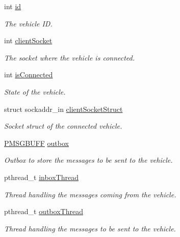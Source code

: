 \begin{DoxyCompactItemize}
\item 
int \hyperlink{struct_s_a___v_e_h_i_c_l_e___d_a_t_a_a7441ef0865bcb3db9b8064dd7375c1ea}{id}
\begin{DoxyCompactList}\small\item\em The vehicle ID. \end{DoxyCompactList}\item 
int \hyperlink{struct_s_a___v_e_h_i_c_l_e___d_a_t_a_adc5475d507e3d713ad405bbeb6eb41e7}{client\+Socket}
\begin{DoxyCompactList}\small\item\em The socket where the vehicle is connected. \end{DoxyCompactList}\item 
int \hyperlink{struct_s_a___v_e_h_i_c_l_e___d_a_t_a_aa358768cbc9b8ed27055d5b41726d79a}{is\+Connected}
\begin{DoxyCompactList}\small\item\em State of the vehicle. \end{DoxyCompactList}\item 
struct sockaddr\+\_\+in \hyperlink{struct_s_a___v_e_h_i_c_l_e___d_a_t_a_a202412679559fc3de3606903af333031}{client\+Socket\+Struct}
\begin{DoxyCompactList}\small\item\em Socket struct of the connected vehicle. \end{DoxyCompactList}\item 
\hyperlink{structures_8h_ad63ff8138c416e3817bf5e9ddc033007}{P\+M\+S\+G\+B\+U\+FF} \hyperlink{struct_s_a___v_e_h_i_c_l_e___d_a_t_a_a61ac2e690cdfc9dce53b70b6588a2627}{outbox}
\begin{DoxyCompactList}\small\item\em Outbox to store the messages to be sent to the vehicle. \end{DoxyCompactList}\item 
pthread\+\_\+t \hyperlink{struct_s_a___v_e_h_i_c_l_e___d_a_t_a_ab10e40b00b3f87791ade78b71e7e7134}{inbox\+Thread}
\begin{DoxyCompactList}\small\item\em Thread handling the messages coming from the vehicle. \end{DoxyCompactList}\item 
pthread\+\_\+t \hyperlink{struct_s_a___v_e_h_i_c_l_e___d_a_t_a_acc00a2bda6d34838311c232bf6aaa6a0}{outbox\+Thread}
\begin{DoxyCompactList}\small\item\em Thread handling the messages to be sent to the vehicle. \end{DoxyCompactList}\end{DoxyCompactItemize}


